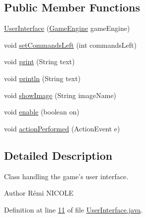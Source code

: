 \subsection*{Public Member Functions}
\begin{DoxyCompactItemize}
\item 
\hyperlink{classUserInterface_a3afe416f3ee335fec8bc815d382c3874}{User\-Interface} (\hyperlink{classGameEngine}{Game\-Engine} game\-Engine)
\item 
void \hyperlink{classUserInterface_ad12f31e49e7ed0904bc51ad330e55147}{set\-Commands\-Left} (int commands\-Left)
\item 
void \hyperlink{classUserInterface_a7a0de5ce2b0e0d25ba6573e87c63c1de}{print} (String text)
\item 
void \hyperlink{classUserInterface_a79f606b4b1f5d1523e50eea00039ed94}{println} (String text)
\item 
void \hyperlink{classUserInterface_ab793a0f12878c698ba3e1720a9f86f3b}{show\-Image} (String image\-Name)
\item 
void \hyperlink{classUserInterface_ab9e499c6c847d52c8753f08d62f1adfc}{enable} (boolean on)
\item 
void \hyperlink{classUserInterface_a0a1ee40a4dbca4aeee002c3d0537c7d5}{action\-Performed} (Action\-Event e)
\end{DoxyCompactItemize}


\subsection{Detailed Description}
Class handling the game's user interface. \begin{DoxyAuthor}{Author}
Rémi N\-I\-C\-O\-L\-E 
\end{DoxyAuthor}


Definition at line \hyperlink{UserInterface_8java_source_l00011}{11} of file \hyperlink{UserInterface_8java_source}{User\-Interface.\-java}.



